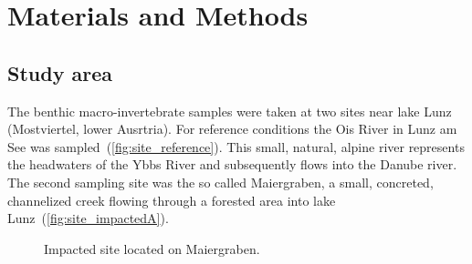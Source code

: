 

\section{Materials and Methods}\label{sec:material_methods}          %

\subsection{Study area}\label{sec:study_area}                %




The benthic macro-invertebrate samples were taken at two sites near lake Lunz (Mostviertel, lower Ausrtria). For reference conditions the Ois River in Lunz am See was sampled~(\cref{fig:site_reference}). This small, natural, alpine river represents the headwaters of the Ybbs River and subsequently flows into the Danube river. The second sampling site was the so called Maiergraben, a small, concreted, channelized creek flowing through a forested area into lake Lunz~(\cref{fig:site_impactedA}).



\begin{figure}[!htb]                                                        %
	\centering                                                                  %
	\subcaptionbox{Heavy regulation present at impacted site.\label{fig:site_impactedA}}{   %
		\texttt{[image: images/site\_impacted1\_color]}}    %
	\hfill                                                                                    %
	\subcaptionbox{Sample collection from impacted area.\label{fig:site_impactedB}}{        %
		\texttt{[image: images/site\_impacted2\_color]}}        %
	\hspace*{\fill}                                                                           %
	\caption{Impacted site located on Maiergraben.}\label{fig:site_impacted}          %
\end{figure}





